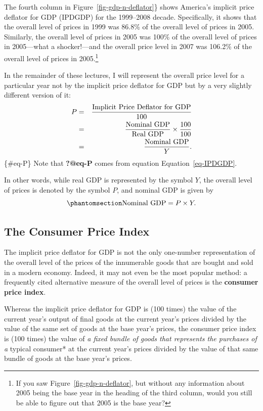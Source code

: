 \documentclass[
  letterpaper,
]{book}
\begin{document}
The fourth column in Figure~\ref{fig-gdp-n-deflator}\} shows America's
implicit price deflator for GDP (IPDGDP) for the 1999--2008 decade.
Specifically, it shows that the overall level of prices in 1999 was
86.8\% of the overall level of prices in 2005. Similarly, the overall
level of prices in 2005 was 100\% of the overall level of prices in
2005---what a shocker!---and the overall price level in 2007 was 106.2\%
of the overall level of prices in 2005.\footnote{If you saw
  Figure~\ref{fig-gdp-n-deflator}, but without any information about
  2005 being the base year in the heading of the third column, would you
  still be able to figure out that 2005 is the base year?}

In the remainder of these lectures, I will represent the overall price
level for a particular year not by the implicit price deflator for GDP
but by a very slightly different version of it: \begin{eqnarray}
P&=&\frac{\hbox{Implicit Price Deflator for GDP}}{100}\nonumber \\
&=&\frac{\hbox{Nominal GDP}}{\hbox{Real GDP}}\times\frac{100}{100}\nonumber \\
&=&\frac{\hbox{Nominal GDP}}{Y}.
\end{eqnarray} \{\#eq-P\} Note that \textbf{?@eq-P} comes from equation
Equation~\ref{eq-IPDGDP}.

In other words, while real GDP is represented by the symbol \(Y\), the
overall level of prices is denoted by the symbol \(P\), and nominal GDP
is given by \begin{equation}\phantomsection\label{eq-nomGDP}{
\hbox{Nominal GDP}=P\times Y.
}\end{equation}

\subsection{The Consumer Price Index}\label{sec-cpi}


The implicit price deflator for GDP is not the only one-number
representation of the overall level of the prices of the innumerable
goods that are bought and sold in a modern economy. Indeed, it may not
even be the most popular method: a frequently cited alternative measure
of the overall level of prices is the \textbf{consumer price index}.

Whereas the implicit price deflator for GDP is (100 times) the value of
the current year's output of final goods at the current year's prices
divided by the value of the same set of goods at the base year's prices,
the consumer price index is (100 times) the value of \emph{a fixed
bundle of goods that represents the purchases of a }typical consumer* at
the current year's prices divided by the value of that same bundle of
goods at the base year's prices.
\end{document}

